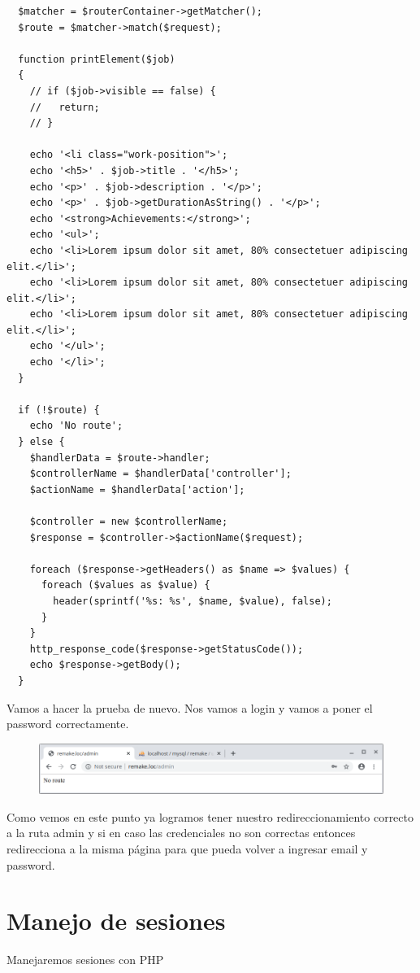 \documentclass{article}
\begin{document}
\begin{verbatim}
  $matcher = $routerContainer->getMatcher();
  $route = $matcher->match($request);

  function printElement($job)
  {
    // if ($job->visible == false) {
    //   return;
    // }

    echo '<li class="work-position">';
    echo '<h5>' . $job->title . '</h5>';
    echo '<p>' . $job->description . '</p>';
    echo '<p>' . $job->getDurationAsString() . '</p>';
    echo '<strong>Achievements:</strong>';
    echo '<ul>';
    echo '<li>Lorem ipsum dolor sit amet, 80% consectetuer adipiscing elit.</li>';
    echo '<li>Lorem ipsum dolor sit amet, 80% consectetuer adipiscing elit.</li>';
    echo '<li>Lorem ipsum dolor sit amet, 80% consectetuer adipiscing elit.</li>';
    echo '</ul>';
    echo '</li>';
  }

  if (!$route) {
    echo 'No route';
  } else {
    $handlerData = $route->handler;
    $controllerName = $handlerData['controller'];
    $actionName = $handlerData['action'];

    $controller = new $controllerName;
    $response = $controller->$actionName($request);

    foreach ($response->getHeaders() as $name => $values) {
      foreach ($values as $value) {
        header(sprintf('%s: %s', $name, $value), false);
      }
    }
    http_response_code($response->getStatusCode());
    echo $response->getBody();
  }
\end{verbatim}

Vamos a hacer la prueba de nuevo. Nos vamos a login y vamos a poner el password
correctamente.\\

\begin{figure}[h!]
  \centering
  \includegraphics[scale=0.5]{./Pictures/212_admin_ok.png}
\end{figure}

Como vemos en este punto ya logramos tener nuestro redireccionamiento correcto
a la ruta admin y si en caso las credenciales no son correctas entonces
redirecciona a la misma página para que pueda volver a ingresar email y
password.\\

\newpage

\section{Manejo de sesiones}%
Manejaremos sesiones con PHP\\
\end{document}
